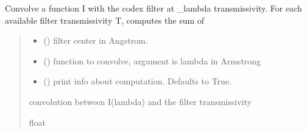 \documentclass[letterpaper,10pt,english]{sphinxmanual}
\begin{document}
\begin{fulllineitems}
\label{\detokenize{doppler_dimming_lib:doppler_dimming_lib.codex.convolve_codex_filter}}
\pysigstartsignatures
{}
\pysigstopsignatures
\sphinxAtStartPar
Convolve a function I with the codex filter at \_lambda transmissivity. For each available filter transmissivity T, computes the sum of
\begin{quote}\begin{description}
\begin{itemize}
\item {} 
\sphinxAtStartPar
{} () \textendash{} filter center in Angstrom.

\item {} 
\sphinxAtStartPar
{} () \textendash{} function to convolve, argument is lambda in Armstrong

\item {} 
\sphinxAtStartPar
{} (\sphinxstyleliteralemphasis{\sphinxupquote{, }}) \textendash{} print info about computation. Defaults to True.

\end{itemize}

\sphinxAtStartPar
convolution between I(lambda) and the filter transmissivity

\sphinxAtStartPar
float

\end{description}\end{quote}

\end{fulllineitems}

\end{document}
